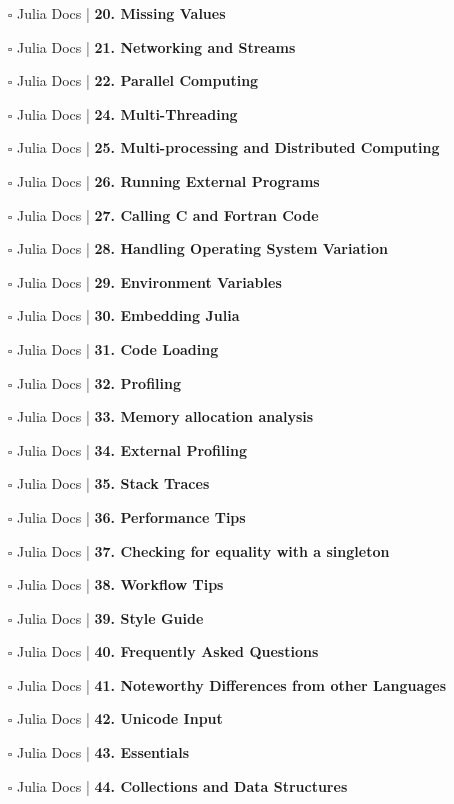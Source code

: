 \documentclass[a4, landscape, 12pt]{article}
\newcommand{\checkbox}{$\square$}%
\begin{document}
\begin{itemize}
{}
\item [\checkbox]  Julia Docs | \textbf{ 20. Missing Values
}
\item [\checkbox]  Julia Docs | \textbf{ 21. Networking and Streams
}
\item [\checkbox]  Julia Docs | \textbf{ 22. Parallel Computing
}
\item [\checkbox]  Julia Docs | \textbf{ 24. Multi-Threading
}
\item [\checkbox]  Julia Docs | \textbf{ 25. Multi-processing and Distributed Computing
}
\item [\checkbox]  Julia Docs | \textbf{ 26. Running External Programs
}
\item [\checkbox]  Julia Docs | \textbf{ 27. Calling C and Fortran Code
}
\item [\checkbox]  Julia Docs | \textbf{ 28. Handling Operating System Variation
}
\item [\checkbox]  Julia Docs | \textbf{ 29. Environment Variables
}
\item [\checkbox]  Julia Docs | \textbf{ 30. Embedding Julia
}
\item [\checkbox]  Julia Docs | \textbf{ 31. Code Loading
}
\item [\checkbox]  Julia Docs | \textbf{ 32. Profiling
}
\item [\checkbox]  Julia Docs | \textbf{ 33. Memory allocation analysis
}
\item [\checkbox]  Julia Docs | \textbf{ 34. External Profiling
}
\item [\checkbox]  Julia Docs | \textbf{ 35. Stack Traces
}
\item [\checkbox]  Julia Docs | \textbf{ 36. Performance Tips
}
\item [\checkbox]  Julia Docs | \textbf{ 37. Checking for equality with a singleton
}
\item [\checkbox]  Julia Docs | \textbf{ 38. Workflow Tips
}
\item [\checkbox]  Julia Docs | \textbf{ 39. Style Guide
}
\item [\checkbox]  Julia Docs | \textbf{ 40. Frequently Asked Questions
}
\item [\checkbox]  Julia Docs | \textbf{ 41. Noteworthy Differences from other Languages
}
\item [\checkbox]  Julia Docs | \textbf{ 42. Unicode Input
}
\item [\checkbox]  Julia Docs | \textbf{ 43. Essentials
}
\item [\checkbox]  Julia Docs | \textbf{ 44. Collections and Data Structures
}
\end{itemize}
\end{document}
